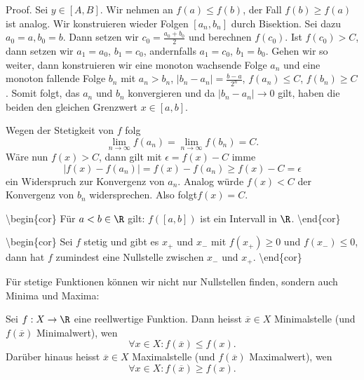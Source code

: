 \documentclass[letterpaper,10pt,english]{jupyterBook}
\begin{document}
\begin{emphBox}{}{}
Proof.  Sei \(y \in [A,B]\). Wir nehmen an \(f(a) \leq f(b)\), der Fall \(f(b) \geq f(a)\) ist analog. Wir konstruieren wieder Folgen \([a_n,b_n]\) durch Bisektion. Sei dazu \(a_0=a, b_0=b\). Dann setzen wir \(c_0 = \frac{a_0+b_0}2\) und berechnen \(f(c_0)\). Ist \(f(c_0) > C\), dann setzen wir \(a_1=a_0\), \(b_1=c_0\), andernfalls \(a_1=c_0\), \(b_1=b_0\). Gehen wir so weiter, dann konstruieren wir eine monoton wachsende Folge \(a_n\) und eine monoton fallende Folge \(b_n\) mit \(a_n > b_n\), \(|b_n-a_n|=\frac{b-a}{2^n}\), \(f(a_n) \leq C\), \(f(b_n) \geq C\). Somit folgt, das \(a_n\) und \(b_n\) konvergieren und da \(|b_n-a_n|\rightarrow 0\) gilt, haben die beiden den gleichen Grenzwert \(x \in [a,b]\).

Wegen der Stetigkeit von \(f\) folg
\begin{equation*}
 \lim_{n \rightarrow \infty} f(a_n) = \lim_{n \rightarrow \infty} f(b_n) = C.
\end{equation*}
Wäre nun \(f(x) > C\), dann gilt mit \(\epsilon = f(x) - C\) imme
\begin{equation*}
 |f(x) - f(a_n)| = f(x) - f(a_n) \geq f(x) - C = \epsilon
\end{equation*}
ein Widerspruch zur Konvergenz von \(a_n\). Analog würde \(f(x) < C\) der Konvergenz von \(b_n\) widersprechen. Also folgt\(f(x) = C\).
\end{emphBox}

\textbackslash{}begin\{cor\}
Für \(a <b \in \R\) gilt: \(f([a,b])\) ist ein Intervall in \(\R\).
\textbackslash{}end\{cor\}

\textbackslash{}begin\{cor\}
Sei \(f\) stetig und gibt es \(x_+\) und \(x_-\) mit \(f(x_+) \geq 0\) und \(f(x_-) \leq 0\), dann hat \(f\) zumindest eine Nullstelle zwischen \(x_-\) und \(x_+\).
\textbackslash{}end\{cor\}

Für stetige Funktionen können wir nicht nur Nullstellen finden, sondern auch Minima und Maxima:
\label{stetigkeit/eigenschaften:definition-1}
\begin{definition}{}{}



Sei \(f: X \rightarrow \R\) eine reellwertige Funktion. Dann heisst \(\overline{x} \in X\) Minimalstelle (und \(f(\overline{x})\) Minimalwert), wen
\begin{equation*}
 \forall x \in X: f(\overline{x}) \leq f(x).
\end{equation*}
Darüber hinaus heisst \(\overline{x} \in X\) Maximalstelle (und \(f(\overline{x})\) Maximalwert), wen
\begin{equation*}
 \forall x \in X: f(\overline{x}) \geq f(x).
\end{equation*}\end{definition}
\end{document}
